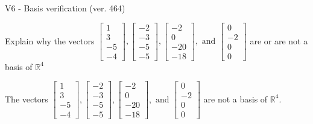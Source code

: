 \begin{exercise}
  \begin{exerciseTitle}V6 - Basis verification (ver. 464)\end{exerciseTitle}
  \begin{exerciseStatement}
    Explain why the vectors \(\left[\begin{array}{r}
1 \\
3 \\
-5 \\
-4
\end{array}\right] , \left[\begin{array}{r}
-2 \\
-3 \\
-5 \\
-5
\end{array}\right] , \left[\begin{array}{r}
-2 \\
0 \\
-20 \\
-18
\end{array}\right] , \text{ and } \left[\begin{array}{r}
0 \\
-2 \\
0 \\
0
\end{array}\right]\) are or are not a basis of \(\mathbb{R}^4\)	


  \end{exerciseStatement}
  \begin{exerciseAnswer}
   The vectors \(\left[\begin{array}{r}
1 \\
3 \\
-5 \\
-4
\end{array}\right] , \left[\begin{array}{r}
-2 \\
-3 \\
-5 \\
-5
\end{array}\right] , \left[\begin{array}{r}
-2 \\
0 \\
-20 \\
-18
\end{array}\right] , \text{ and } \left[\begin{array}{r}
0 \\
-2 \\
0 \\
0
\end{array}\right]\) 
  	 are not  a basis of \(\mathbb{R}^4\).
  


  \end{exerciseAnswer}
\end{exercise}